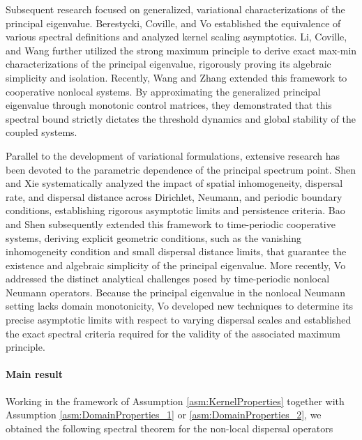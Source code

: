 \documentclass[11pt, a4paper]{article}
\theoremstyle{break}
\theoremstyle{break}
\theoremstyle{break}
\theoremstyle{break}
\theoremstyle{break}
\theoremstyle{break}
\theoremstyle{break}
\theoremstyle{break}
\theoremstyle{break}
\begin{document}
Subsequent research focused on generalized, variational characterizations of the principal eigenvalue. Berestycki, Coville, and Vo \cite{BerestyckiCovilleVo2016} established the equivalence of various spectral definitions and analyzed kernel scaling asymptotics. Li, Coville, and Wang \cite{LiCovilleWang2017} further utilized the strong maximum principle to derive exact max-min characterizations of the principal eigenvalue, rigorously proving its algebraic simplicity and isolation. Recently, Wang and Zhang \cite{WangZhang2026} extended this framework to cooperative nonlocal systems. By approximating the generalized principal eigenvalue through monotonic control matrices, they demonstrated that this spectral bound strictly dictates the threshold dynamics and global stability of the coupled systems.

Parallel to the development of variational formulations, extensive research has been devoted to the parametric dependence of the principal spectrum point. Shen and Xie \cite{ShenXie2015} systematically analyzed the impact of spatial inhomogeneity, dispersal rate, and dispersal distance across Dirichlet, Neumann, and periodic boundary conditions, establishing rigorous asymptotic limits and persistence criteria. Bao and Shen \cite{BaoShen2016} subsequently extended this framework to time-periodic cooperative systems, deriving explicit geometric conditions, such as the vanishing inhomogeneity condition and small dispersal distance limits, that guarantee the existence and algebraic simplicity of the principal eigenvalue. More recently, Vo \cite{Vo2022} addressed the distinct analytical challenges posed by time-periodic nonlocal Neumann operators. Because the principal eigenvalue in the nonlocal Neumann setting lacks domain monotonicity, Vo developed new techniques to determine its precise asymptotic limits with respect to varying dispersal scales and established the exact spectral criteria required for the validity of the associated maximum principle.

\paragraph{Main result}

Working in the framework of Assumption \ref{asm:KernelProperties} together with Assumption \ref{asm:DomainProperties_1} or \ref{asm:DomainProperties_2}, we obtained the following spectral theorem for the non-local dispersal operators
\end{document}
